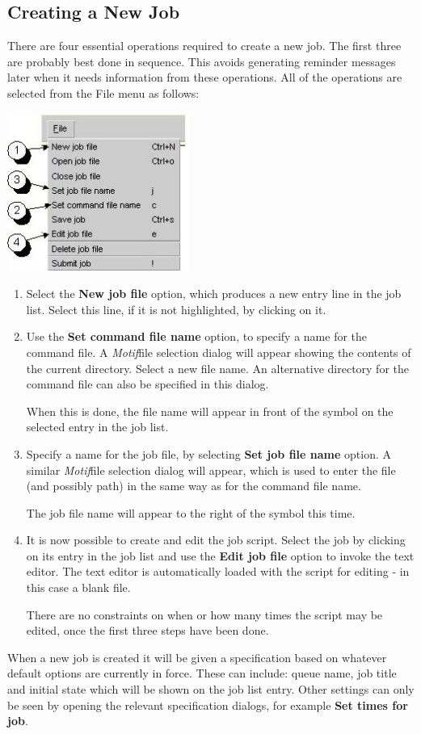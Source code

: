 \subsection{Creating a New Job}
There are four essential operations required to create a new job. The first three are probably best done in sequence. This avoids \XmbtrName{}
generating reminder messages later when it needs information from these operations. All of the operations are selected from the File menu as
follows:

 \includegraphics[width=5.943cm,height=5.186cm]{img/ref45.jpg} 

\begin{enumerate}
\item Select the \textbf{New job file} option, which produces a new entry line in the job list. Select this line, if it is not highlighted,
by clicking on it.
\item Use the \textbf{Set command file name} option, to specify a name for the command file. A \textit{Motif}file selection dialog will appear
showing the contents of the current directory. Select a new file name. An alternative directory for the command file can also be specified in
this dialog.

When this is done, the file name will appear in front of the \exampletext{{}-{\textgreater}} symbol on the selected entry
in the job list.
\item Specify a name for the job file, by selecting \textbf{Set job file name} option. A similar \textit{Motif}file selection dialog will
appear, which is used to enter the file (and possibly path) in the same way as for the command file name.

The job file name will appear to the right of the \exampletext{{}-{\textgreater}} symbol this time.
\item It is now possible to create and edit the job script. Select the job by clicking on its entry in the job list and use the \textbf{Edit
job file} option to invoke the text editor. The text editor is automatically loaded with the script for editing - in this case a blank
file.

There are no constraints on when or how many times the script may be edited, once the first three steps have been done.
\end{enumerate}
When a new job is created it will be given a specification based on whatever default options are currently in force. These can include:
queue name, job title and initial state which will be shown on the job list entry. Other settings can only be seen by opening the relevant
specification dialogs, for example \textbf{Set times for job}.

